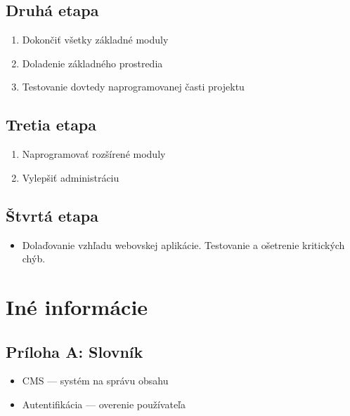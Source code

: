 \documentclass[a4paper,titlepage,11pt]{article}
\begin{document}
\subsection{Druhá etapa}
\begin{enumerate}
 \item Dokončiť všetky základné moduly
 \item Doladenie základného prostredia
 \item Testovanie dovtedy naprogramovanej časti projektu
\end{enumerate}

\subsection{Tretia etapa}
\begin{enumerate}
 \item Naprogramovať rozšírené moduly
 \item Vylepšiť administráciu
\end{enumerate}

\subsection{Štvrtá etapa}
\begin{itemize}
 \item Dolaďovanie vzhľadu webovskej aplikácie. Testovanie a ošetrenie kritických chýb. 
\end{itemize}

\newpage
\section{Iné informácie}

\subsection*{Príloha A: Slovník}
\begin{itemize}
 \item CMS --- systém na správu obsahu
 \item Autentifikácia --- overenie používateľa
\end{itemize}
\end{document}
